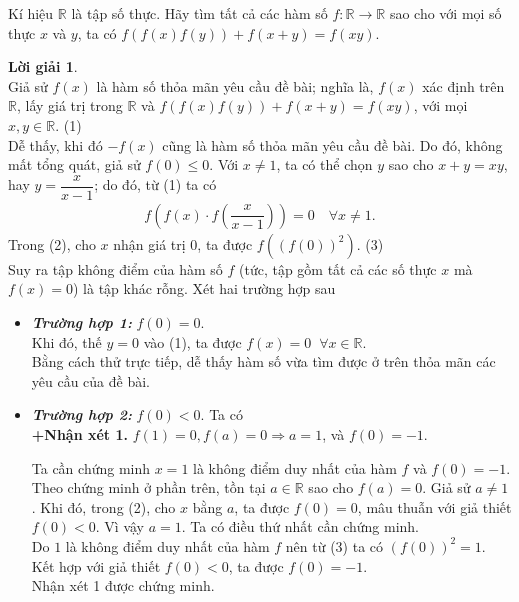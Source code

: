 \begin{bt}%
	Kí hiệu $\mathbb{R}$ là tập số thực. Hãy tìm tất cả các hàm số $f: \mathbb{R}\longrightarrow \mathbb{R}$ sao cho với mọi số thực $x$ và $y$, ta có $f\left(f(x)f(y)\right)+f(x+y)=f(xy)$.
	\loigiai
	{
		\textbf{Lời giải 1}.\\
		Giả sử $f(x)$ là hàm số thỏa mãn yêu cầu đề bài; nghĩa là, $f(x)$ xác định trên $\mathbb{R}$, lấy giá trị trong $\mathbb{R}$ và $f\left(f(x)f(y)\right)+f(x+y)=f(xy)$, với mọi $x,y \in \mathbb{R}$.  \hfill (1) \\
		Dễ thấy, khi đó $-f(x)$ cũng là hàm số thỏa mãn yêu cầu đề bài. Do đó, không mất tổng quát, giả sử $f(0) \le 0$.
		Với $x \ne 1$, ta có thể chọn $y$ sao cho $x+y=xy$, hay $y=\dfrac{x}{x-1}$; do đó, từ (1) ta có
		\begin{align*}
			f\left(f(x) \cdot f\left(\dfrac{x}{x-1}\right)\right)=0 \quad \forall x \ne 1. \tag{2}
		\end{align*}
		Trong (2), cho $x$ nhận giá trị $0$, ta được $f\left( \left( f(0)\right) ^2\right)$. \hfill (3) \\
		Suy ra tập không điểm của hàm số $f$ (tức, tập gồm tất cả các số thực $x$ mà $f(x)=0$) là tập khác rỗng.
		Xét hai trường hợp sau
		\begin{itemize}
			\item \textit{\textbf{Trường hợp 1:}} $f(0)=0$.\\
			Khi đó, thế $y=0$ vào (1), ta được $f(x)=0 \;\; \forall x \in \mathbb{R}$.\\
			Bằng cách thử trực tiếp, dễ thấy hàm số vừa tìm được ở trên thỏa mãn các yêu cầu của đề bài.
			\item \textit{\textbf{Trường hợp 2:}} $f(0)<0$. Ta có\\
			\textbf{+Nhận xét 1.} $f(1)=0, f(a)=0 \Rightarrow a=1$, và $f(0)=-1$.
			\begin{cm}
				Ta cần chứng minh $x=1$ là không điểm duy nhất của hàm $f$ và $f(0)=-1$.\\
				Theo chứng minh ở phần trên, tồn tại $a \in \mathbb{R}$ sao cho $f(a)=0$. Giả sử $a \ne 1$. Khi đó, trong (2), cho $x$ bằng $a$, ta được $f(0)=0$, mâu thuẫn với giả thiết $f(0)<0$. Vì vậy $a=1$. Ta có điều thứ nhất cần chứng minh.\\
				Do $1$ là không điểm duy nhất của hàm $f$ nên từ (3) ta có $(f(0))^2=1$. Kết hợp với giả thiết $f(0)<0$, ta được $f(0)=-1$.\\
				Nhận xét 1 được chứng minh.
			\end{cm}

\end{itemize}}
\end{bt}

